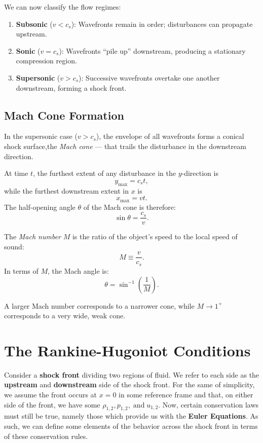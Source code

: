 We can now classify the flow regimes:
\begin{enumerate}
    \item \textbf{Subsonic} ($v < c_s$): Wavefronts remain in order; disturbances can propagate upstream.
    \item \textbf{Sonic} ($v = c_s$): Wavefronts ``pile up'' downstream, producing a stationary compression region.
    \item \textbf{Supersonic} ($v > c_s$): Successive wavefronts overtake one another downstream, forming a shock front.
\end{enumerate}


\subsection{Mach Cone Formation}

In the supersonic case ($v > c_s$), the envelope of all wavefronts forms a conical shock surface,the \emph{Mach cone} --- that trails the disturbance in the downstream direction.

At time $t$, the furthest extent of any disturbance in the $y$-direction is
\[
y_{\max} = c_s t ,
\]
while the furthest downstream extent in $x$ is
\[
x_{\max} = v t .
\]
The half-opening angle $\theta$ of the Mach cone is therefore:
\begin{equation}
    \sin\theta = \frac{c_s}{v} .
\end{equation}

\begin{definition}
The \emph{Mach number} $M$ is the ratio of the object's speed to the local speed of sound:
\[
M \equiv \frac{v}{c_s} .
\]
In terms of $M$, the Mach angle is:
\[
\theta = \sin^{-1} \left( \frac{1}{M} \right) .
\]
\end{definition}

A larger Mach number corresponds to a narrower cone, while $M \to 1^+$ corresponds to a very wide, weak cone.

\section{The Rankine-Hugoniot Conditions}

Consider a \textbf{shock front} dividing two regions of fluid. We refer to each side as the \textbf{upstream} and \textbf{downstream} side of the shock front. For the same of simplicity, we assume the front occurs at $x = 0$ in some reference frame and that, on either side of the front, we have some $\rho_{1,2},p_{1,2}, \;\text{and}\; u_{1,2}$. Now, certain conservation laws must still be true, namely those which provide us with the \textbf{Euler Equations}. As such, we can define some elements of the behavior across the shock front in terms of these conservation rules.

